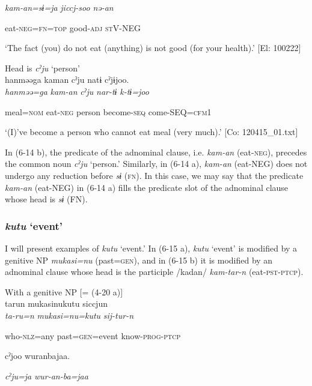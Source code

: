       \textit{kam-an=sɨ=ja}  \textit{jiccj-soo}  \textit{nə-an}

      eat-\textsc{neg}=\textsc{fn}=\textsc{top}  good-\textsc{adj}  \textsc{st}V-NEG

\glt ‘The fact (you) do not eat (anything) is not good (for your health).’ [El: 100222]

 \ex Head is \textit{cˀju} ‘person’\\
{\TM}
\gll  hanməəga  kaman  cˀju  natɨ  cˀjɨjoo.\\

      \textit{hanməə=ga}  \textit{kam-an}  \textit{cˀju}  \textit{nar-tɨ}  \textit{k-tɨ=joo}

      meal=\textsc{nom}  eat-\textsc{neg}  person  become-\textsc{seq}  come-SEQ=\textsc{cfm}1

\glt ‘(I)’ve become a person who cannot eat meal (very much).’ [Co: 120415\_01.txt]
\z

In (6-14 b), the predicate of the adnominal clause, i.e. \textit{kam-an} (eat-\textsc{neg}), precedes the common noun \textit{cˀju} ‘person.’ Similarly, in (6-14 a), \textit{kam-an} (eat-NEG) does not undergo any reduction before \textit{sɨ} (\textsc{fn}). In this case, we may say that the predicate \textit{kam-an} (eat-NEG) in (6-14 a) fills the predicate slot of the adnominal clause whose head is \textit{sɨ} (FN).

\subsubsection{\textit{kutu} ‘event’}

I will present examples of \textit{kutu} ‘event.’ In (6-15 a), \textit{kutu} ‘event’ is modified by a genitive NP \textit{mukasi=nu} (past=\textsc{gen}), and in (6-15 b) it is modified by an adnominal clause whose head is the participle /kadan/ \textit{kam-tar-n} (eat-\textsc{pst}-\textsc{ptcp}).

\ea\label{ex:6-15}
\ea With a genitive NP [= (4-20 a)]\\
{\TM}
\gll  tarun  mukasinukutu  siccjun\\

      \textit{ta-ru=n}  \textit{mukasi=nu=kutu}  \textit{sij-tur-n}

      who-\textsc{nlz}=any  past=\textsc{gen}=event  know-\textsc{prog}-\textsc{ptcp}

      cˀjoo  wuranbajaa.

      \textit{cˀju=ja}  \textit{wur-an-ba=jaa}

